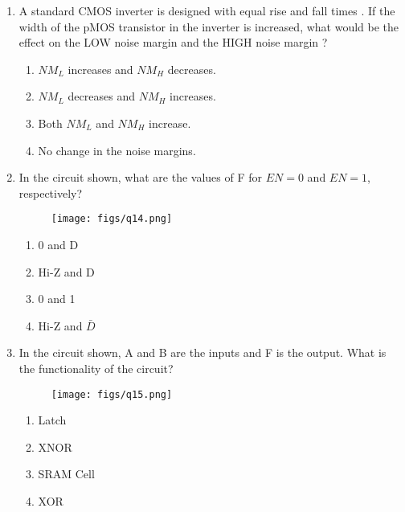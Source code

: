 \documentclass[a4paper, 11pt]{article}
\begin{document}
\begin{enumerate}
    \hfill{}

    \item A standard CMOS inverter is designed with equal rise and fall times . If the width of the pMOS transistor in the inverter is increased, what would be the effect on the LOW noise margin  and the HIGH noise margin ?
    
    \begin{enumerate}
        \item $NM_{L}$ increases and $NM_{H}$ decreases.
        \item $NM_{L}$ decreases and $NM_{H}$ increases.
        \item Both $NM_{L}$ and $NM_{H}$ increase.
        \item No change in the noise margins.
    \end{enumerate}

    \hfill{}

    \item In the circuit shown, what are the values of F for $EN=0$ and $EN=1$, respectively?
    
    \begin{figure}[H]
        \centering
        \texttt{[image: figs/q14.png]}
        \caption*{}
        \label{fig:q14}
    \end{figure}
    
    \begin{enumerate}
        \item 0 and D
        \item Hi-Z and D
        \item 0 and 1
        \item Hi-Z and $\bar{D}$
    \end{enumerate}
    
    \hfill{}
    
    \item In the circuit shown, A and B are the inputs and F is the output. What is the functionality of the circuit?
    
    \begin{figure}[H]
        \centering
        \texttt{[image: figs/q15.png]}
        \caption*{}
        \label{fig:q15}
    \end{figure}

    \begin{enumerate}
        \item Latch
        \item XNOR
        \item SRAM Cell
        \item XOR
    \end{enumerate}
    

\end{enumerate}
\end{document}
